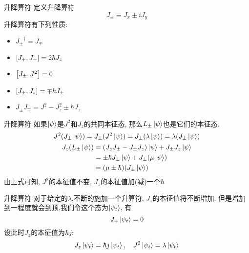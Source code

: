 \documentclass{beamer}
\begin{document}
\begin{frame}{升降算符}
定义升降算符
\begin{equation}
J_{\pm} \equiv J_x \pm i J_y
\end{equation}
升降算符有下列性质:
\begin{itemize}
\item ${J_\pm}^\dag = J_\mp$
\item $\comm{J_+}{J_-} = 2 \hbar J_z$
\item $\comm{J_\pm}{J^2} = 0$
\item $\comm{J_\pm}{J_z} = \mp \hbar J_\pm$
\item $J_\pm J_\mp = J^2 - J_z^2 \pm \hbar J_z$
\end{itemize}
\end{frame}

\begin{frame}{升降算符}
如果$\ket{\psi}$是$J^2$和$J_z$的共同本征态, 那么$L_\pm \ket{\psi}$也是它们的本征态.
\begin{gather}
J^2(J_\pm \ket{\psi}) = J_\pm (J^2 \ket{\psi}) = J_\pm  (\lambda \ket{\psi}) = \lambda (J_\pm \ket{\psi}) \\
\begin{split}
J_z (L_\pm \ket{\psi}) &= (J_z J_\pm - J_\pm J_z) \ket{\psi} + J_\pm J_z \ket{\psi} \\
  &= \pm \hbar J_\pm \ket{\psi} + J_\pm (\mu \ket{\psi}) \\
  &= (\mu \pm \hbar) (J_\pm \ket{\psi})
\end{split}
\end{gather}
由上式可知, $J^2$的本征值不变, $J_z$的本征值加(减)一个$\hbar$
\end{frame}

\begin{frame}{升降算符}
对于给定的$\lambda$,不断的施加一个升算符, $J_z$的本征值将不断增加. 但是增加到一程度就会到顶,我们令这个态为$\ket{\psi_t}$, 有
\begin{equation}
J_+ \ket{\psi_t} = 0
\end{equation}
设此时$J_z$的本征值为$\hbar j$:
\begin{equation}
J_z \ket{\psi_t} = \hbar j \ket{\psi_t}, \quad J^2 \ket{\psi_t} = \lambda \ket{\psi_t}
\end{equation}

\end{frame}
\end{document}
